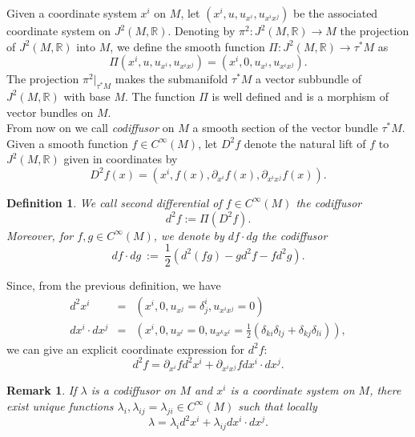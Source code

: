 \documentclass{article}[10pt]
\newtheorem{definition}[theorem]{Definition}
\newtheorem{remark}[theorem]{Remark}
\newcommand{\cinf}[0]{C^{\infty}}
\begin{document}
Given a  coordinate system $ x ^ i$   on $ M $, let  $(x ^ i, u, u_ {x^i}, u_
{x ^ ix ^ j}) $ be the associated coordinate system  on $ J ^ 2
(M, \mathbb {R}) $.  Denoting by $ \pi^2: J ^ 2 (M, \mathbb {R}) \rightarrow M $ the
projection of $ J ^ 2 (M, \mathbb{R}) $ into $ M $, we define the
 smooth function $\Pi:J^2(M,\mathbb{R}) \rightarrow \tau^*M $ as
\begin{equation}
\Pi (x ^ i, u, u_{ x^ {i}}, u_{x ^ ix ^ j}) = (x ^ i, 0, u_ {x ^ i}, u_ {x ^ ix ^ j} ).
\end{equation}
The projection $ \pi ^ 2 | _ {\tau ^ * M} $ makes the submanifold
$ \tau ^ * M $ a vector subbundle of $ J ^ 2 (M, \mathbb {R}) $
with base $ M $. The function $ \Pi $ is well defined and is a
morphism  of vector bundles on $ M $.\\
From now on we call \emph{codiffusor} on $M$ a smooth section of the vector bundle $
\tau ^ * M $.\\
Given a smooth function $ f \in \cinf(M)$, let $ D ^ 2f$  denote the
natural lift of $ f $ to $ J ^ 2 (M, \mathbb {R}) $ given in
coordinates  by
\begin{equation}
D^2f(x)=(x^i,f(x),\partial_{x^i}f(x),\partial_{x^ix^j}f(x)).
\end{equation}
\begin{definition}\label{definition_differential}
We call \emph{second differential} of $f \in \cinf(M)$ the codiffusor
$$d^2f:=\Pi(D^2f).$$
Moreover, for $f,g \in \cinf(M)$, we denote by  $df \cdot dg$ the codiffusor
$$df \cdot dg \ := \ \frac{1}{2}(d^2(fg)-gd^2f-fd^2g).$$
\end{definition}

\noindent Since, from the previous definition, we have
\begin{eqnarray*}
d^2x^i&=&(x^i,0,u_{x^j}=\delta^i_j,u_{x^ix^j}=0) \  \\
dx^i \cdot dx^j&=&\left(x^i,0,u_{x^l}=0,u_{x^kx^l}=\frac{1}{2}(\delta_{ki}\delta_{lj}+\delta_{kj}\delta_{li})\right),
\end{eqnarray*}
we can give an explicit coordinate expression for $d^2f$:
\begin{equation}
 d ^ 2f = \partial_{x ^ i}fd ^ 2x ^ i + \partial_{x ^ ix ^ j} fdx ^ i \cdot dx ^ j.
\end{equation}

\begin{remark}\label{remark_codiffusor2}
If $ \lambda $ is a codiffusor on $ M $ and $ x ^ i $ is a
coordinate system on $ M $, there exist unique  functions $
\lambda_i, \lambda_ {ij} = \lambda_ {ji} \in \cinf(M)$ such that
locally
\begin{equation}
\lambda=\lambda_i d^2x^i+\lambda_{ij} dx^i \cdot dx^j.
\end{equation}
\end{remark}
\end{document}
